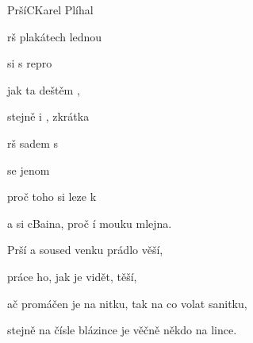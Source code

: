 \setcounter{page}{71}
\begin{song}{Prší}{C}{Karel Plíhal}

\begin{SBChorus}

rš   plakátech lednou

 si  s repro

jak ta  deštěm ,

stejně  i , zkrátka

\end{SBChorus}

\begin{SBVerse}

rš   sadem s 

 se  jenom 

proč  toho  si leze k 

a  si cBaina, proč í mouku  mlejna.

\end{SBVerse}

\begin{SBChorus}

\end{SBChorus}

\begin{SBVerse}

Prší a soused venku prádlo věší,

práce ho, jak je vidět, těší,

ač promáčen je na nitku, tak na co volat sanitku,

stejně na čísle blázince je věčně někdo na lince.

\end{SBVerse}

\end{song}

\clearpage
